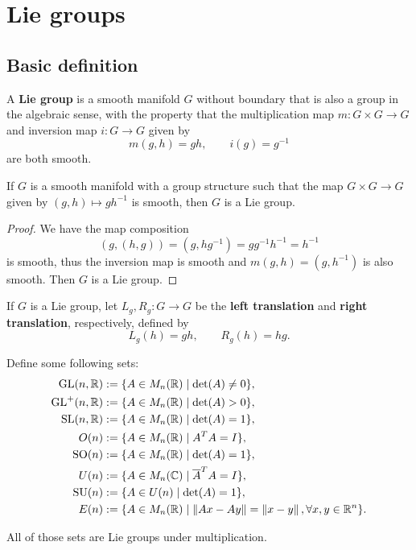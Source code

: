 \chapter{Lie groups}
\section{Basic definition}
\begin{definition}
    A \textbf{Lie group} is a smooth manifold $G$ without boundary that is also a group in the algebraic sense, with the property that the multiplication map $m: G \times G \to G$ and inversion map $i: G \to G$ given by 
    \[
        m(g,h) = gh, \qquad i(g) = g^{-1}
    \]
    are both smooth.
\end{definition}
\begin{lemma}
    If $G$ is a smooth manifold with a group structure such that the map $G \times G \to G$ given by $(g,h) \mapsto gh^{-1}$ is smooth, then $G$ is a Lie group.
\end{lemma}
\begin{proof}
    We have the map composition 
    \[
        (g,(h,g)) = (g,hg^{-1}) = gg^{-1}h^{-1} = h^{-1}
    \]
    is smooth, thus the inversion map is smooth and $m(g,h) = (g,h^{-1})$ is also smooth. Then $G$ is a Lie group.
\end{proof}
\begin{definition}
    If $G$ is a Lie group, let $L_g,R_g: G \to G$ be the \textbf{left translation} and \textbf{right translation}, respectively, defined by 
    \[
        L_g(h) = gh, \qquad R_g(h) = hg.
    \]
\end{definition}
\begin{definition}
    Define some following sets:
    \begin{align*}
    \text{GL}(n,\mathbb{R}) &:= \{A \in M_n(\mathbb{R}) \mid \det(A) \neq 0\},\\
    \text{GL}^+(n,\mathbb{R}) &:= \{A \in M_n(\mathbb{R})\mid \det(A) > 0\},\\
    \text{SL}(n,\mathbb{R}) &:= \{A \in M_n(\mathbb{R})\mid \det(A) =1\},\\
    O(n) &:= \{A \in M_n(\mathbb{R}) \mid A^TA = I\},\\
    \text{SO}(n) &:= \{A \in M_n(\mathbb{R}) \mid \det(A) = 1\},\\
    U(n) &:= \{A \in M_n(\mathbb{C}) \mid \overline{A}^TA= I \},\\
    \text{SU}(n) &:= \{ A \in U(n) \mid \det(A) = 1\},\\
    E(n)&:= \{A \in M_n(\mathbb{R}) \mid \left\lVert Ax - Ay \right\rVert = \left\lVert x - y \right\rVert, \forall x,y \in \mathbb{R}^n\}.
    \end{align*}
\end{definition}
\begin{lemma}
    All of those sets are Lie groups under multiplication.
\end{lemma}
